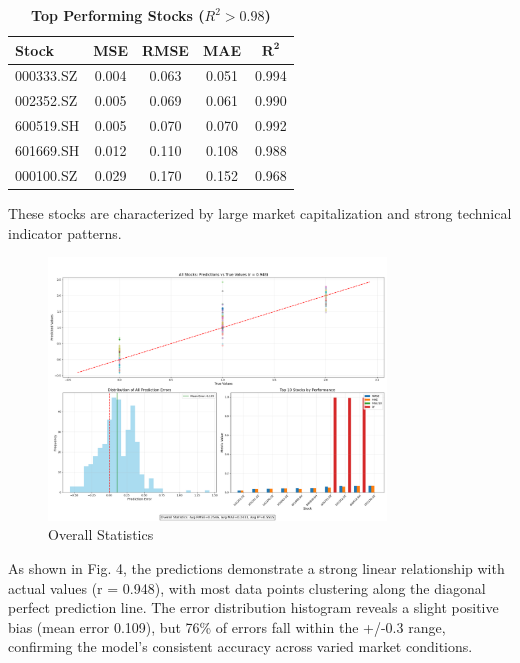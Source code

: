 \documentclass[3p,times,procedia]{elsarticle}
\begin{document}
\begin{table}[!ht]
\centering
\caption{\textbf{Top Performing Stocks ($R^2 > 0.98$)}}
\renewcommand{\arraystretch}{1.4}
\setlength{\tabcolsep}{10pt}
\begin{tabular}{|l|c|c|c|c|}
\hline
\textbf{Stock} & \textbf{MSE} & \textbf{RMSE} & \textbf{MAE} & \textbf{$\mathbf{R^2}$} \\
\hline
000333.SZ  & 0.004 & 0.063 & 0.051 & 0.994 \\
002352.SZ  & 0.005 & 0.069 & 0.061 & 0.990 \\
600519.SH  & 0.005 & 0.070 & 0.070 & 0.992 \\
601669.SH  & 0.012 & 0.110 & 0.108 & 0.988 \\
000100.SZ  & 0.029 & 0.170 & 0.152 & 0.968 \\
\hline
\end{tabular}
\end{table}

These stocks are characterized by large market capitalization and strong technical indicator patterns.
\begin{figure}[!ht] %
    \centering
    \includegraphics[width=0.80\textwidth]{Picture3.png} %

    \caption{Overall Statistics}
    \label{fig:Return Forecast Calculation}
\end{figure}
\newpage
As shown in Fig. 4, the predictions demonstrate a strong linear relationship with actual values (r = 0.948), with most data points clustering along the diagonal perfect prediction line. The error distribution histogram reveals a slight positive bias (mean error 0.109), but 76\% of errors fall within the +/-0.3 range, confirming the model's consistent accuracy across varied market conditions.
\end{document}
